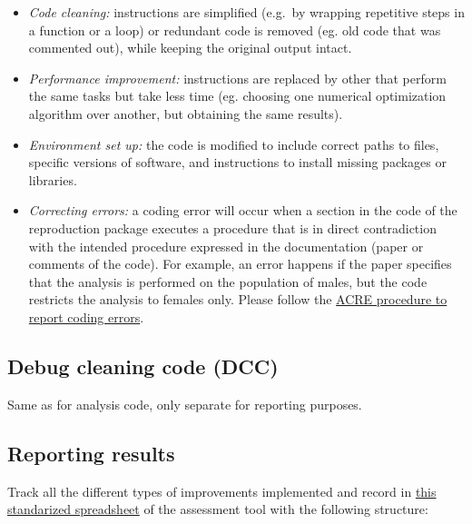 \documentclass[]{book}
\providecommand{\tightlist}{%
  \setlength{\itemsep}{0pt}\setlength{\parskip}{0pt}}
\begin{document}
\begin{itemize}
\tightlist
\item
  \emph{Code cleaning:} instructions are simplified (e.g.~by wrapping repetitive steps in a function or a loop) or redundant code is removed (eg. old code that was commented out), while keeping the original output intact.\\
\item
  \emph{Performance improvement:} instructions are replaced by other that perform the same tasks but take less time (eg. choosing one numerical optimization algorithm over another, but obtaining the same results).\\
\item
  \emph{Environment set up:} the code is modified to include correct paths to files, specific versions of software, and instructions to install missing packages or libraries.\\
\item
  \emph{Correcting errors:} a coding error will occur when a section in the code of the reproduction package executes a procedure that is in direct contradiction with the intended procedure expressed in the documentation (paper or comments of the code). For example, an error happens if the paper specifies that the analysis is performed on the population of males, but the code restricts the analysis to females only. Please follow the \href{ADD\%20LINK}{ACRE procedure to report coding errors}.
\end{itemize}

\hypertarget{debug-cleaning-code-dcc}{%
\subsection{Debug cleaning code (DCC)}\label{debug-cleaning-code-dcc}}

Same as for analysis code, only separate for reporting purposes.

\hypertarget{reporting-results}{%
\subsection{Reporting results}\label{reporting-results}}

Track all the different types of improvements implemented and record in \href{https://docs.google.com/spreadsheets/d/1LUIdVFH0OfR70C7z07TYeE-uWzKI_JIeWUMaYhqEKK0/edit\#gid=0\&range=A3}{this standarized spreadsheet} of the assessment tool with the following structure:
\end{document}

